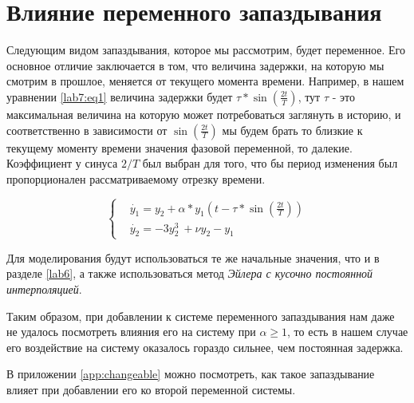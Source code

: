 \chapter{Влияние переменного запаздывания}\label{lab7}

Следующим видом запаздывания, которое мы рассмотрим, будет
переменное. Его основное отличие заключается в том, что
величина задержки, на которую мы смотрим в прошлое,
меняется от текущего момента времени. Например,
в нашем уравнении \eqref{lab7:eq1} величина задержки будет
$\tau*\sin(\frac{2t}{T})$, тут $\tau$ - это максимальная
величина на которую может потребоваться заглянуть в историю,
и соответственно в зависимости от $\sin(\frac{2t}{T})$ мы будем
брать то близкие к текущему моменту времени значения фазовой
переменной, то далекие. Коэффициент у синуса $2/T$ был выбран для того,
что бы период изменения был пропорционален рассматриваемому
отрезку времени.

\begin{equation}\label{lab7:eq1}
  \begin{cases}
      &\dot{y_1} = y_2 + \alpha * y_1(t-\tau*\sin(\frac{2t}{T}))\\
      &\dot{y_2} = -3y_2^3\ + \nu y_2 - y_1
  \end{cases}
\end{equation}

Для моделирования будут использоваться те же начальные
значения, что и в разделе \ref{lab6}, а также использоваться
метод \textit{Эйлера с кусочно постоянной интерполяцией}.

\clearpage

Таким образом, при добавлении к системе переменного запаздывания
нам даже не удалось посмотреть влияния его на систему при
$\alpha \geq 1$, то есть в нашем случае его воздействие на
систему оказалось гораздо сильнее, чем постоянная задержка.

В приложении \ref{app:changeable} можно посмотреть, как
такое запаздывание влияет при добавлении его ко второй
переменной системы.

